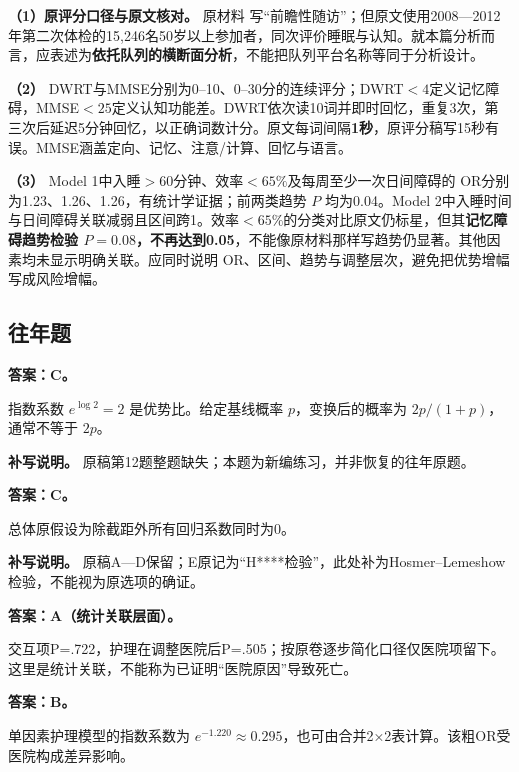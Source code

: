 \textbf{（1）原评分口径与原文核对。} 原材料 写``前瞻性随访''；但原文使用2008---2012年第二次体检的15,246名50岁以上参加者，同次评价睡眠与认知。就本篇分析而言，应表述为\textbf{依托队列的横断面分析}，不能把队列平台名称等同于分析设计。

\textbf{（2）} DWRT与MMSE分别为0--10、0--30分的连续评分；DWRT\(<4\)定义记忆障碍，MMSE\(<25\)定义认知功能差。DWRT依次读10词并即时回忆，重复3次，第三次后延迟5分钟回忆，以正确词数计分。原文每词间隔\textbf{1秒}，原评分稿写15秒有误。MMSE涵盖定向、记忆、注意/计算、回忆与语言。

\textbf{（3）} Model 1中入睡\(>60\)分钟、效率\(<65\%\)及每周至少一次日间障碍的 OR分别为1.23、1.26、1.26，有统计学证据；前两类趋势 \(P\) 均为0.04。Model 2中入睡时间与日间障碍关联减弱且区间跨1。效率\(<65\%\)的分类对比原文仍标星，但其\textbf{记忆障碍趋势检验 \(P=0.08\)，不再达到0.05}，不能像原材料那样写趋势仍显著。其他因素均未显示明确关联。应同时说明 OR、区间、趋势与调整层次，避免把优势增幅写成风险增幅。


\subsection{往年题}


\textbf{答案：C。}

指数系数 \(e^{\log2}=2\) 是优势比。给定基线概率 \(p\)，变换后的概率为 \(2p/(1+p)\)，通常不等于 \(2p\)。

\textbf{补写说明。} 原稿第12题整题缺失；本题为新编练习，并非恢复的往年原题。



\textbf{答案：C。}

总体原假设为除截距外所有回归系数同时为0。

\textbf{补写说明。} 原稿A---D保留；E原记为``H****检验''，此处补为Hosmer--Lemeshow检验，不能视为原选项的确证。



\textbf{答案：A（统计关联层面）。}

交互项P=.722，护理在调整医院后P=.505；按原卷逐步简化口径仅医院项留下。这里是统计关联，不能称为已证明``医院原因''导致死亡。



\textbf{答案：B。}

单因素护理模型的指数系数为 \(e^{-1.220}\approx0.295\)，也可由合并2×2表计算。该粗OR受医院构成差异影响。


